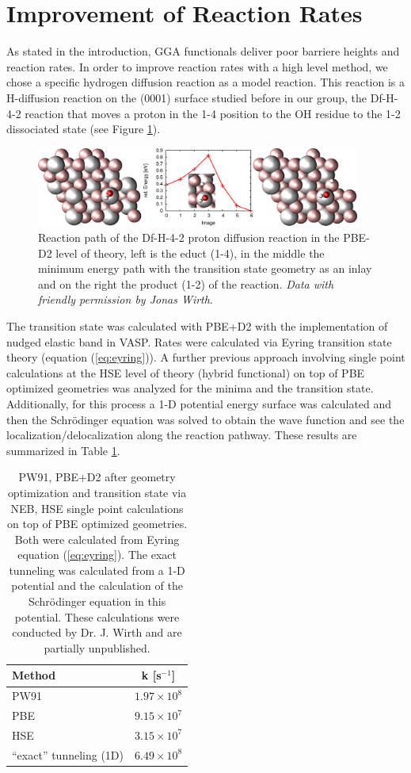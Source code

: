 \documentclass[11pt,DIV=13,BCOR=5mm,a4paper,headinclude]{scrbook}
\begin{document}
\section{Improvement of Reaction Rates}\label{crystal_calc}
As stated in the introduction, GGA functionals deliver poor barriere heights and reaction rates.
In order to improve reaction rates with a high level method, we chose a specific hydrogen diffusion reaction as a model reaction.
This reaction is a H-diffusion reaction on the (0001) surface studied before in our group, the Df-H-4-2 reaction\cite{WirthJPCC2012} that moves a proton in the 1-4 position to the OH residue to the 1-2 dissociated state (see Figure \ref{abb:df-h-4-2}).
\begin{figure}[h]
\centering
\includegraphics[width=0.95\textwidth]{figures/0001/NEB-path/df-h-4-2.pdf}
\caption{Reaction path of the Df-H-4-2 proton diffusion reaction in the PBE-D2 level of theory, left is the educt (1-4), in the middle the minimum energy path with the transition state geometry as an inlay and on the right the product (1-2) of the reaction.
\textit{Data with friendly permission by Jonas Wirth}.}
       \label{abb:df-h-4-2}
\end{figure}
The transition state was calculated with PBE+D2 with the implementation of nudged elastic band in VASP.
Rates were calculated via Eyring transition state theory (equation (\ref{eq:eyring})).
A further previous approach involving single point calculations at the HSE level of theory (hybrid functional) on top of PBE optimized geometries was analyzed for the minima and the transition state.
Additionally, for this process a 1-D potential energy surface was calculated and then the Schrödinger equation was solved to obtain the wave function and see the localization/delocalization along the reaction pathway.
These results are summarized in Table \ref{tab:4-2results_jonas}.
\begin{table}[!h]
  \centering
  \caption{PW91, PBE+D2 after geometry optimization and transition state via NEB, HSE single point calculations on top of PBE optimized geometries.
Both were calculated from Eyring equation (\ref{eq:eyring}).
The exact tunneling was calculated from a 1-D potential and the calculation of the Schrödinger equation in this potential.
These calculations were conducted by Dr. J. Wirth and are partially unpublished.}
\hspace*{-1cm}
 \begin{tabular}{l|c}
 \toprule
 Method&k [s$^{-1}$] \\
    \midrule
 PW91 & $1.97\times 10^8$\\
 PBE & $9.15\times 10^7$\\
 HSE & $3.15\times 10^7$\\
 ``exact'' tunneling (1D) & $6.49\times 10^8$\\\bottomrule
  \end{tabular}
  \label{tab:4-2results_jonas}
\end{table}
\end{document}
